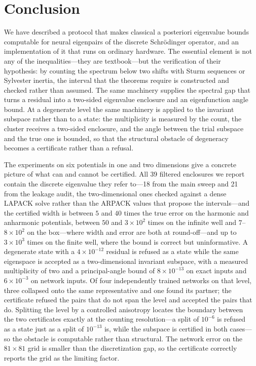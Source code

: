 \section{Conclusion}
\label{sec:conclusion}

We have described a protocol that makes classical a posteriori eigenvalue
bounds computable for neural eigenpairs of the discrete Schr\"odinger
operator, and an implementation of it that runs on ordinary hardware. The
essential element is not any of the inequalities---they are textbook---but the
verification of their hypothesis: by counting the spectrum below two shifts
with Sturm sequences or Sylvester inertia, the interval that the theorems
require is constructed and checked rather than assumed. The same machinery
supplies the spectral gap that turns a residual into a two-sided eigenvalue
enclosure and an eigenfunction angle bound. At a degenerate level the same
machinery is applied to the invariant subspace rather than to a state: the
multiplicity is measured by the count, the cluster receives a two-sided
enclosure, and the angle between the trial subspace and the true one is
bounded, so that the structural obstacle of degeneracy becomes a certificate
rather than a refusal.

The experiments on six potentials in one and two dimensions give a concrete
picture of what can and cannot be certified. All 39 filtered enclosures we
report contain the discrete eigenvalue they refer to---18 from the main sweep
and 21 from the leakage audit, the two-dimensional ones checked against a
dense LAPACK solve rather than the ARPACK values that propose the
intervals---and the certified width is
between $5$ and $40$ times the true error on the harmonic and anharmonic
potentials, between $50$ and $3\times10^{2}$ times on the infinite well and
$7$--$8\times10^{2}$ on the box---where width and error are both at
round-off---and up to $3\times10^{3}$ times on the finite well, where the
bound is correct but uninformative. A
degenerate state with a $4\times10^{-12}$ residual is refused as a state while
the same eigenspace is accepted as a two-dimensional invariant subspace, with a
measured multiplicity of two and a principal-angle bound of
$8\times10^{-13}$ on exact inputs and $6\times10^{-3}$ on network inputs. Of
four independently trained networks on that level, three collapsed onto the
same representative and one found its partner; the certificate refused the
pairs that do not span the level and accepted the pairs that do. Splitting the
level by a controlled anisotropy locates the boundary between the two
certificates exactly at the counting resolution---a split of $10^{-6}$ is
refused as a state just as a split of $10^{-13}$ is, while the subspace is
certified in both cases---so the obstacle is computable rather than
structural. The network
error on the $81\times81$ grid is smaller than the discretization gap, so the
certificate correctly reports the grid as the limiting factor.

